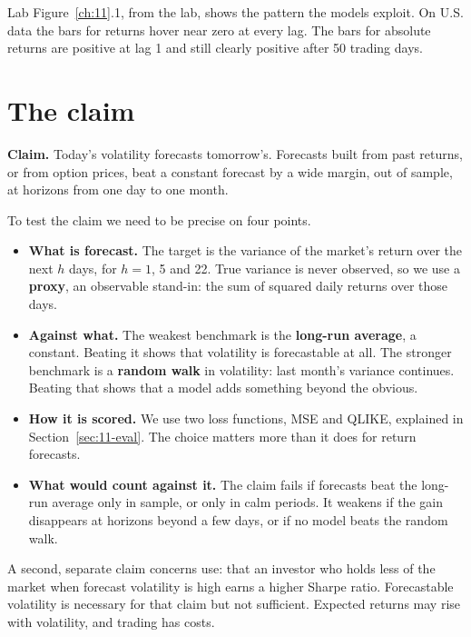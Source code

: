 Lab Figure~\ref{ch:11}.1, from the lab, shows the pattern the models exploit. On U.S. data the bars for returns hover near zero at every lag. The bars for absolute returns are positive at lag 1 and still clearly positive after 50 trading days.

\section{The claim}
\label{sec:11-claim}

\begin{callout}
\textbf{Claim.} Today's volatility forecasts tomorrow's. Forecasts built from past returns, or from option prices, beat a constant forecast by a wide margin, out of sample, at horizons from one day to one month.
\end{callout}

To test the claim we need to be precise on four points.

\begin{itemize}
  \item \textbf{What is forecast.} The target is the variance of the market's return over the next $h$ days, for $h = 1$, 5 and 22. True variance is never observed, so we use a \textbf{proxy}, an observable stand-in: the sum of squared daily returns over those days.
  \item \textbf{Against what.} The weakest benchmark is the \textbf{long-run average}, a constant. Beating it shows that volatility is forecastable at all. The stronger benchmark is a \textbf{random walk} in volatility: last month's variance continues. Beating that shows that a model adds something beyond the obvious.
  \item \textbf{How it is scored.} We use two loss functions, MSE and QLIKE, explained in Section~\ref{sec:11-eval}. The choice matters more than it does for return forecasts.
  \item \textbf{What would count against it.} The claim fails if forecasts beat the long-run average only in sample, or only in calm periods. It weakens if the gain disappears at horizons beyond a few days, or if no model beats the random walk.
\end{itemize}

A second, separate claim concerns use: that an investor who holds less of the market when forecast volatility is high earns a higher Sharpe ratio. Forecastable volatility is necessary for that claim but not sufficient. Expected returns may rise with volatility, and trading has costs.

